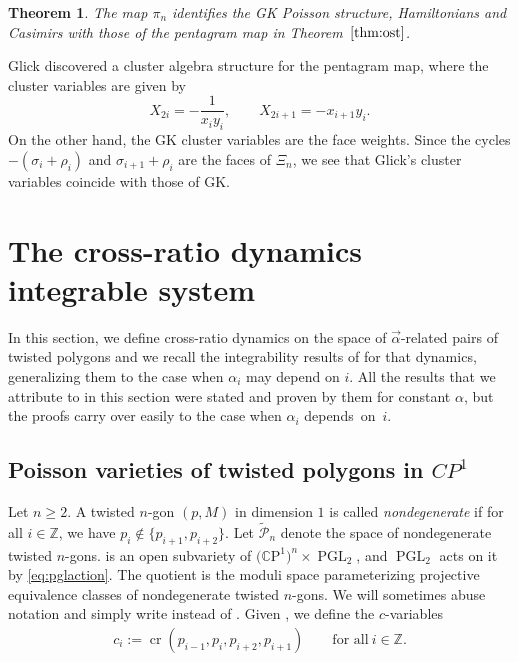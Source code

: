 \documentclass[10pt,a4paper]{amsart}
\numberwithin{equation}{section}
\newtheorem{Theorem}{Theorem}[section]
\newcommand{\Z}{{\mathbb Z}}
\newcommand{\C}{{\mathbb C}}
\newcommand{\CP}{{\mathbb C\mathrm P}}
\renewcommand{\P}{{\mathbb P}}
\newcommand{\PGL}{\operatorname{PGL}}
\newcommand{\la}{\label}
\def\cro{\operatorname{cr}}
\def\boldsymbol#1{#1}
\def\C{C}
\def\P{P}
\begin{document}
	\begin{Theorem}\la{mainthm:pentagram}
		The map $\pi_n$ identifies the GK Poisson structure, Hamiltonians and Casimirs with those of the pentagram map in Theorem~$\ref{thm:ost}$.
	\end{Theorem}
	\begin{Remark}
		Glick \cite{Glick} discovered a cluster algebra structure for the pentagram map, where the cluster variables are given by
		\[
		X_{2i}=-\frac{1}{x_i y_i}, \qquad X_{2i+1}= -x_{i+1} y_{i}.
		\]
		On the other hand, the GK cluster variables are the face weights. Since the cycles $-(\sigma_i+\rho_i)$ and $\sigma_{i+1}+\rho_i$ are the faces of $\Xi_n$, we see that Glick's cluster variables coincide with those of GK.
	\end{Remark}
	
	\section{The cross-ratio dynamics integrable system}
	\label{sec:crdynamics}
	
	In this section, we define cross-ratio dynamics on the space of $\vec{\alpha}$-related pairs of twisted polygons and we recall the integrability results of \cite{AFIT} for that dynamics, generalizing them to the case when $\alpha_i$ may depend on $i$. All the results that we attribute to \cite{AFIT} in this section were stated and proven by them for constant $\alpha$, but the proofs carry over easily to the case when $\alpha_i$ depends~on~$i$.
	
	\subsection[Poisson varieties of twisted polygons in C P\^{}1]{Poisson varieties of twisted polygons in $\boldsymbol{\C \P^1}$}
	
	Let $n\geq2$. A twisted $n$-gon $(p,M)$ in dimension $1$ is called \emph{nondegenerate} if for all $i \in \Z$, we have $p_i \notin \{p_{i+1},p_{i+2}\}$. Let $\widetilde {\mathcal P}_n$ denote the space of nondegenerate twisted $n$-gons.  is an open subvariety of $\big(\CP^1\big)^n \times \PGL_2$, and $\PGL_2$ acts on it by \eqref{eq:pglaction}. The quotient \smash{$\mathcal P_n:=\widetilde{\mathcal P}_n / \PGL_2$} is the moduli space parameterizing projective equivalence classes of nondegenerate twisted $n$-gons. We will sometimes abuse notation and simply write  instead of . Given , we define the $c$-variables
	\begin{align}\la{def:c}
		c_i := \cro(p_{i-1},p_i,p_{i+2},p_{i+1}) \qquad \text{for all}\ i \in \Z.
	\end{align}
	
\end{document}
